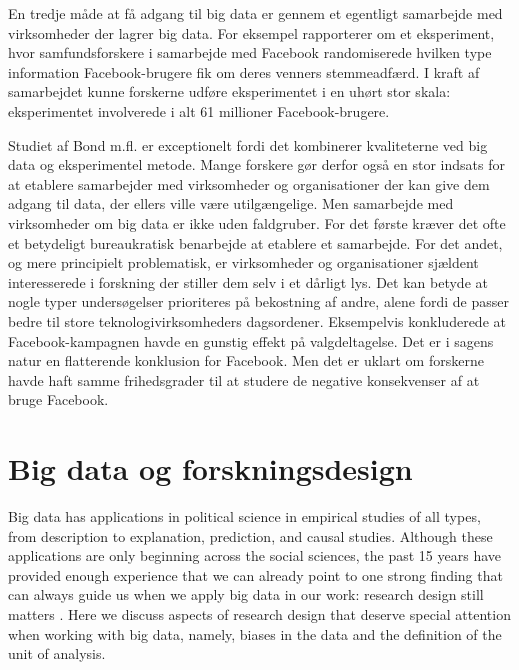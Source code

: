 \documentclass[12pt,]{article}
\begin{document}
En tredje måde at få adgang til big data er gennem et egentligt
samarbejde med virksomheder der lagrer big data. For eksempel
rapporterer \citet{bond2012} om et eksperiment, hvor samfundsforskere i
samarbejde med Facebook randomiserede hvilken type information
Facebook-brugere fik om deres venners stemmeadfærd. I kraft af
samarbejdet kunne forskerne udføre eksperimentet i en uhørt stor skala:
eksperimentet involverede i alt 61 millioner Facebook-brugere.

Studiet af Bond m.fl. er exceptionelt fordi det kombinerer kvaliteterne
ved big data og eksperimentel metode. Mange forskere gør derfor også en
stor indsats for at etablere samarbejder med virksomheder og
organisationer der kan give dem adgang til data, der ellers ville være
utilgængelige. Men samarbejde med virksomheder om big data er ikke uden
faldgruber. For det første kræver det ofte et betydeligt bureaukratisk
benarbejde at etablere et samarbejde. For det andet, og mere principielt
problematisk, er virksomheder og organisationer sjældent interesserede i
forskning der stiller dem selv i et dårligt lys. Det kan betyde at nogle
typer undersøgelser prioriteres på bekostning af andre, alene fordi de
passer bedre til store teknologivirksomheders dagsordener. Eksempelvis
konkluderede \citet{bond2012} at Facebook-kampagnen havde en gunstig
effekt på valgdeltagelse. Det er i sagens natur en flatterende
konklusion for Facebook. Men det er uklart om forskerne havde haft samme
frihedsgrader til at studere de negative konsekvenser af at bruge
Facebook.

\hypertarget{big-data-og-forskningsdesign}{%
\section{Big data og
forskningsdesign}\label{big-data-og-forskningsdesign}}

Big data has applications in political science in empirical studies of
all types, from description to explanation, prediction, and causal
studies. Although these applications are only beginning across the
social sciences, the past 15 years have provided enough experience that
we can already point to one strong finding that can always guide us when
we apply big data in our work: research design still matters
\citetext{\citealp[see][p.~13]{toshkov16}; \citealp{CG15}}. Here we
discuss aspects of research design that deserve special attention when
working with big data, namely, biases in the data and the definition of
the unit of analysis.
\end{document}
